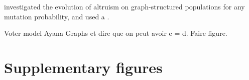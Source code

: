 \documentclass[11pt, letterpaper]{article}
\begin{document}
 investigated the evolution of altruism on graph-structured populations for any mutation probability, and used a . 

Voter model Ayana Graphs et dire que on peut avoir e = d. Faire figure. 


\clearpage




\clearpage


\appendix
 
\renewcommand{\theequation}{\thesection.\arabic{equation}}
\setcounter{equation}{0}  %
 
\renewcommand{\thefigure}{S\arabic{figure}}
\setcounter{figure}{0}

\section*{Supplementary figures} 
\end{document}
